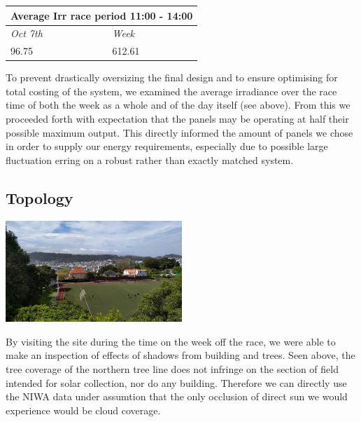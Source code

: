 \documentclass[11pt]{article}
\begin{document}
\begin{table}[h!]
    \begin{center}
        \begin{tabular}{|l|l|}
            \hline
            \multicolumn{2}{|c|}{\textbf{Average Irr race period 11:00 - 14:00}} \\ \hline
            \textit{Oct 7th}                   & \textit{Week}                   \\ \hline
            96.75                              & 612.61                     \\ \hline
        \end{tabular}
    \end{center}
\end{table}

To prevent drastically oversizing the final design and to ensure optimising for total costing of the system, we examined the average irradiance over the race time of both the week as a whole and of the day itself (see above). From this we proceeded forth with expectation that the panels may be operating at half their possible maximum output. This directly informed the amount of panels we chose in order to supply our energy requirements, especially due to possible large fluctuation erring on a robust rather than exactly matched system.

\subsection{Topology}

\begin{center}
    \includegraphics[width=0.5\textwidth]{inc/IMG20201006120746.jpg}
\end{center}

By visiting the site during the time on the week off the race, we were able to make an inspection of effects of shadows from building and trees. Seen above, the tree coverage of the northern tree line does not infringe on the section of field intended for solar collection, nor do any building. Therefore we can directly use the NIWA data under assumtion that the only occlusion of direct sun we would experience would be cloud coverage.
\end{document}
